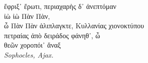 
\begin{minipage}{.25\linewidth}\end{minipage}
\hfill
\begin{minipage}{.75\linewidth}
\begin{flushright}
  \raggedright
  ἔφριξ᾽ ἔρωτι, περιαχαρὴς δ᾽ ἀνεπτόμαν \\
  ἰὼ ἰὼ Πὰν Πὰν, \\
  ὦ Πὰν Πὰν ἁλιπλαγκτε, Κυλλανίας χιονοκτύπου \\
  πετραίας ἀπὸ δειράδος φάνηθ᾽, ὦ \\
  θεῶν χοροπόι᾽ ἄναξ \\
  \raggedleft \textit{Sophocles, Ajax.}
\end{flushright}
\end{minipage}

